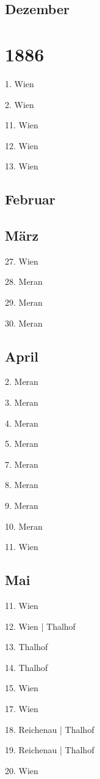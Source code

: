 \documentclass[twoside=false,titlepage=false,open=any, parskip=never, fontsize=10pt, headings=small, chapterprefix=false, appendixprefix=false, DIV=15]{scrbook}
\begin{document}
\begin{multicols}{3}
            \section*{Dezember}
            \chapter*{1886}
            1. Wien\par
            2. Wien\par
            11. Wien\par
            12. Wien\par
            13. Wien\par
            \section*{Februar}
            \section*{März}
            27. Wien\par
            28. Meran\par
            29. Meran\par
            30. Meran\par
            \section*{April}
            2. Meran\par
            3. Meran\par
            4. Meran\par
            5. Meran\par
            7. Meran\par
            8. Meran\par
            9. Meran\par
            10. Meran\par
            11. Wien\par
            \section*{Mai}
            11. Wien\par
            12. Wien | Thalhof\par
            13. Thalhof\par
            14. Thalhof\par
            15. Wien\par
            17. Wien\par
            18. Reichenau | Thalhof\par
            19. Reichenau | Thalhof\par
            20. Wien\par

\end{multicols}
\end{document}
